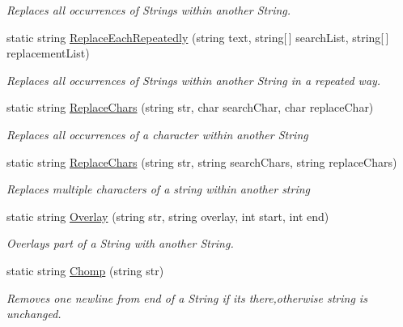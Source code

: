 \begin{DoxyCompactItemize}
\begin{DoxyCompactList}\small\item\em Replaces all occurrences of Strings within another String. \end{DoxyCompactList}\item 
static string \hyperlink{class_ultimate_1_1_utilities_1_1_string_utils_a84a1fe14cbf3840e1ef64488374dbc49}{Replace\+Each\+Repeatedly} (string text, string\mbox{[}$\,$\mbox{]} search\+List, string\mbox{[}$\,$\mbox{]} replacement\+List)
\begin{DoxyCompactList}\small\item\em Replaces all occurrences of Strings within another String in a repeated way. \end{DoxyCompactList}\item 
static string \hyperlink{class_ultimate_1_1_utilities_1_1_string_utils_a712c5ab8c7ca68a9f2311f34bcfc6ad4}{Replace\+Chars} (string str, char search\+Char, char replace\+Char)
\begin{DoxyCompactList}\small\item\em Replaces all occurrences of a character within another String \end{DoxyCompactList}\item 
static string \hyperlink{class_ultimate_1_1_utilities_1_1_string_utils_a34a7a29912200701e515076bab550a99}{Replace\+Chars} (string str, string search\+Chars, string replace\+Chars)
\begin{DoxyCompactList}\small\item\em Replaces multiple characters of a string within another string \end{DoxyCompactList}\item 
static string \hyperlink{class_ultimate_1_1_utilities_1_1_string_utils_a7adbec612599b055c98ee56904abe7bb}{Overlay} (string str, string overlay, int start, int end)
\begin{DoxyCompactList}\small\item\em Overlays part of a String with another String. \end{DoxyCompactList}\item 
static string \hyperlink{class_ultimate_1_1_utilities_1_1_string_utils_aaf5bda5ea98303526302e584936ec57c}{Chomp} (string str)
\begin{DoxyCompactList}\small\item\em Removes one newline from end of a String if it\textquotesingle{}s there,otherwise string is unchanged. \end{DoxyCompactList}\item 

\end{DoxyCompactItemize}
